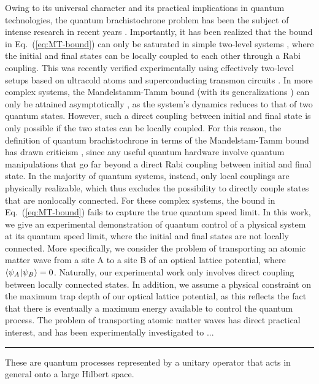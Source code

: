 \documentclass[aps,pra,reprint,a4paper,nofootinbib,superscriptaddress,numbers,longbibliography,showpacs,showkeys,floatfix]{revtex4-1}
\def\braket#1#2{\left\langle#1\kern-2pt\right.\left|#2\right\rangle}
\begin{document}
Owing to its universal character and its practical implications in quantum technologies, the quantum brachistochrone problem has been the subject of intense research in recent years \cite{Uhlmann:2009,Deffner:2017a}.
%
Importantly, it has been realized that the bound in Eq.~(\ref{eq:MT-bound}) can only be saturated in simple two-level systems \cite{Uhlmann:2009}, where the initial and final states can be locally coupled to each other through a Rabi coupling.
%
This was recently verified experimentally using effectively two-level setups based on ultracold atoms \cite{Bason:2012} and superconducting transmon circuits \cite{Vepsalainen:2019}.
%
In more complex systems, the Mandelstamm-Tamm bound (with its generalizations \cite{Margolus:1998}) can only be attained asymptotically \cite{Levitin:2009}, as the system's dynamics reduces to that of two quantum states.
%
However, such a direct coupling between initial and final state is only possible if the two states can be locally coupled.
%
For this reason,  the definition of quantum brachistochrone in terms of the Mandelstam-Tamm bound has drawn criticism \cite{Bukov:2019}, since any useful quantum hardware involve quantum manipulations that go far beyond a direct Rabi coupling between initial and final state.
%
In the majority of quantum systems, instead, only local couplings are  physically realizable, which thus excludes the possibility to directly couple states that are nonlocally connected.
%
For these complex systems, the bound in Eq.~(\ref{eq:MT-bound}) fails to capture the true quantum speed limit.
%
In this work, we give an experimental demonstration of quantum control of a physical system at its quantum speed limit, where the initial and final states are not locally connected.
%
More specifically, we consider the problem of transporting an atomic matter wave from a site A to a site B of an optical lattice potential, where $\braket{\psi_A}{\psi_B} = 0$.
%
Naturally, our experimental work only involves direct coupling between locally connected states.
%
In addition, we assume a physical constraint on the maximum trap depth of our optical lattice potential, as this reflects the fact that there is eventually a maximum energy available to control the quantum process.
%
The problem of transporting atomic matter waves has direct practical interest, and has been experimentally investigated to ... \cite{Couvert:2008} \cite{Bowler:2012} \cite{Walther:2012} \cite{Sorensen:2016a}
%





\vspace{1cm}
\noindent\rule{\columnwidth}{0.4pt}
These are quantum processes represented by a unitary operator that acts in general onto a large Hilbert space.
\end{document}

